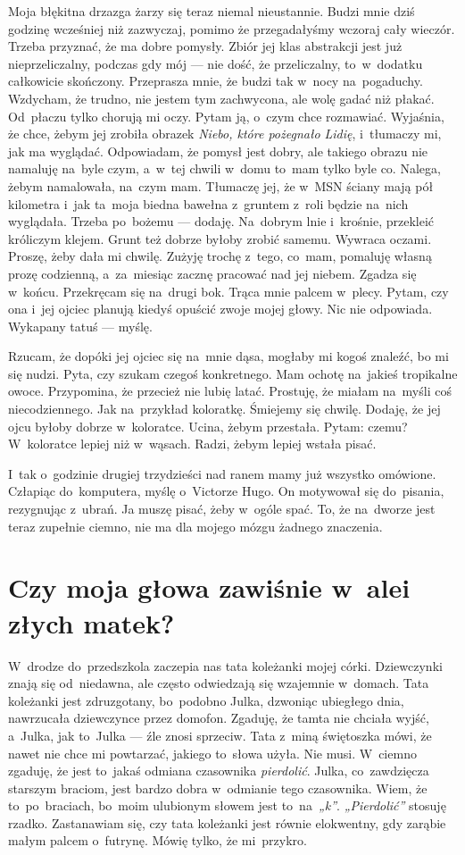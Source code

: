 \documentclass[9pt, a5paper]{memoir}
\begin{document}
Moja błękitna drzazga żarzy się teraz niemal nieustannie. Budzi mnie dziś godzinę wcześniej niż zazwyczaj, pomimo że przegadałyśmy wczoraj cały wieczór. Trzeba przyznać, że ma dobre pomysły. Zbiór jej klas abstrakcji jest już nieprzeliczalny, podczas gdy mój --- nie dość, że przeliczalny, to~w~dodatku całkowicie skończony. Przeprasza mnie, że budzi tak w~nocy na~pogaduchy. Wzdycham, że trudno, nie jestem tym zachwycona, ale wolę gadać niż płakać. Od~płaczu tylko chorują mi oczy. Pytam ją, o~czym chce rozmawiać. Wyjaśnia, że chce, żebym jej zrobiła obrazek \textit{Niebo, które pożegnało Lidię}, i~tłumaczy mi, jak ma wyglądać. Odpowiadam, że pomysł jest dobry, ale takiego obrazu nie namaluję na~byle czym, a~w~tej chwili w~domu to~mam tylko byle co. Nalega, żebym namalowała, na~czym mam. Tłumaczę jej, że w~MSN ściany mają pół kilometra i~jak ta~moja biedna bawełna z~gruntem z~roli będzie na~nich wyglądała. Trzeba po~bożemu --- dodaję. Na~dobrym lnie i~krośnie, przekleić króliczym klejem. Grunt też dobrze byłoby zrobić samemu. Wywraca oczami. Proszę, żeby dała mi chwilę. Zużyję trochę z~tego, co~mam, pomaluję własną prozę codzienną, a~za~miesiąc zacznę pracować nad jej niebem. Zgadza się w~końcu. Przekręcam się na~drugi bok. Trąca mnie palcem w~plecy. Pytam, czy ona i~jej ojciec planują kiedyś opuścić zwoje mojej głowy. Nic nie odpowiada. Wykapany tatuś --- myślę.

Rzucam, że dopóki jej ojciec się na~mnie dąsa, mogłaby mi kogoś znaleźć, bo mi się nudzi. Pyta, czy szukam czegoś konkretnego. Mam ochotę na~jakieś tropikalne owoce. Przypomina, że przecież nie lubię latać. Prostuję, że miałam na~myśli coś niecodziennego. Jak na~przykład koloratkę. Śmiejemy się chwilę. Dodaję, że jej ojcu byłoby dobrze w~koloratce. Ucina, żebym przestała. Pytam: czemu? W~koloratce lepiej niż w~wąsach. Radzi, żebym lepiej wstała pisać.

I~tak o~godzinie drugiej trzydzieści nad ranem mamy już wszystko omówione. Człapiąc do~komputera, myślę o~Victorze Hugo. On motywował się do~pisania, rezygnując z~ubrań. Ja muszę pisać, żeby w~ogóle spać. To, że na~dworze jest teraz zupełnie ciemno, nie ma dla mojego mózgu żadnego znaczenia.

\newpage
\section{Czy moja głowa zawiśnie w~alei złych matek?}
W~drodze do~przedszkola zaczepia nas tata koleżanki mojej córki. Dziewczynki znają się od~niedawna, ale często odwiedzają się wzajemnie w~domach. Tata koleżanki jest zdruzgotany, bo~podobno Julka, dzwoniąc ubiegłego dnia, nawrzucała dziewczynce przez domofon. Zgaduję, że tamta nie chciała wyjść, a~Julka, jak to~Julka --- źle znosi sprzeciw. Tata z~miną świętoszka mówi, że nawet nie chce mi powtarzać, jakiego to~słowa użyła. Nie musi. W~ciemno zgaduję, że jest to~jakaś odmiana czasownika \textit{pierdolić}. Julka, co~zawdzięcza starszym braciom, jest bardzo dobra w~odmianie tego czasownika. Wiem, że to~po~braciach, bo~moim ulubionym słowem jest to~na~\textit{„k”}. \textit{„Pierdolić”} stosuję rzadko. Zastanawiam się, czy tata koleżanki jest równie elokwentny, gdy zarąbie małym palcem o~futrynę. Mówię tylko, że mi~przykro.
\end{document}
